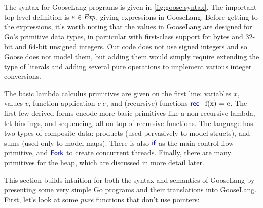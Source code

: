 

The syntax for GooseLang programs is given in \cref{fig:goose:syntax}. The
important top-level definition is $e \in \textit{Exp}$, giving expressions in
GooseLang. Before getting to the expressions, it's worth noting that the values
in GooseLang are designed for Go's primitive data types, in particular with
first-class support for bytes and 32-bit and 64-bit unsigned integers. Our code does
not use signed integers and so Goose does not model them, but adding them would simply
require extending the type of literals and adding several pure operations to
implement various integer conversions.

The basic lambda calculus primitives are given on the first line: variables $x$,
values $v$, function application $e \: e$, and (recursive) functions $\mbox{\ensuremath{\mathsf{\textcolor{blue}{rec}}} \, f(x) = e}$.
The first few derived forms encode more basic primitives like a non-recursive
lambda, let bindings, and sequencing, all on top of recursive functions. The
language has two types of composite data: products (used pervasively to model
structs), and sums (used only to model maps). There is also $\mathsf{\textcolor{blue}{if}}$ as the
main control-flow primitive, and $\mathsf{\textcolor{blue}{Fork}}$ to create concurrent threads.
Finally, there are many primitives for the heap, which are discussed in more
detail later.

This section builds intuition for both the syntax and semantics of GooseLang by presenting
some very simple Go programs and their translations into GooseLang. First,
let's look at some \emph{pure} functions that don't use pointers:

\newcommand{\translaterule}{\rule{0.9\textwidth}{0.5pt}}

\newenvironment{translatego}{
  \noindent
  \translaterule \\[-10pt]
  \begin{minipage}[t]{0.5\textwidth}
  \strut\vspace*{-\baselineskip}
  \setminted[go]{frame=none}
}{
  \end{minipage}
  \setminted[go]{frame=lines}
}

\newenvironment{translategooselang}{
  \begin{minipage}[t]{0.5\textwidth}
  \strut\vspace*{-8pt}
}{
  \end{minipage}
  \\[5pt] \translaterule
}

